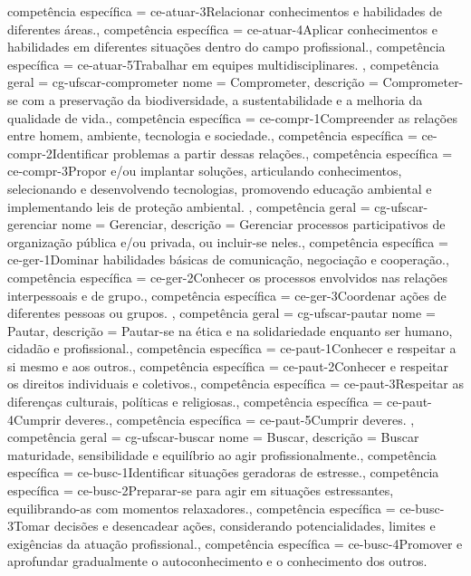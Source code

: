 {{        competência específica = {ce-atuar-3}{Relacionar conhecimentos e habilidades de diferentes áreas.},
        competência específica = {ce-atuar-4}{Aplicar conhecimentos e habilidades em diferentes situações dentro do campo profissional.},
        competência específica = {ce-atuar-5}{Trabalhar em equipes multidisciplinares.}
    },
    competência geral = {cg-ufscar-comprometer}{
        nome = Comprometer,
        descrição = {Comprometer-se com a preservação da biodiversidade, a sustentabilidade e a melhoria da qualidade de vida.},
        competência específica = {ce-compr-1}{Compreender as relações entre homem, ambiente, tecnologia e sociedade.},
        competência específica = {ce-compr-2}{Identificar problemas a partir dessas relações.},
        competência específica = {ce-compr-3}{Propor e/ou implantar soluções, articulando conhecimentos, selecionando e desenvolvendo tecnologias, promovendo educação ambiental e implementando leis de proteção ambiental.}
    },
    competência geral = {cg-ufscar-gerenciar}{
        nome = Gerenciar,
        descrição = {Gerenciar processos participativos de organização pública e/ou privada, ou incluir-se neles.},
        competência específica = {ce-ger-1}{Dominar habilidades básicas de comunicação, negociação e cooperação.},
        competência específica = {ce-ger-2}{Conhecer os processos envolvidos nas relações interpessoais e de grupo.},
        competência específica = {ce-ger-3}{Coordenar ações de diferentes pessoas ou grupos.}
    },
    competência geral = {cg-ufscar-pautar}{
        nome = Pautar,
        descrição = {Pautar-se na ética e na solidariedade enquanto ser humano, cidadão e profissional.},
        competência específica = {ce-paut-1}{Conhecer e respeitar a si mesmo e aos outros.},
        competência específica = {ce-paut-2}{Conhecer e respeitar os direitos individuais e coletivos.},
        competência específica = {ce-paut-3}{Respeitar as diferenças culturais, políticas e religiosas.},
        competência específica = {ce-paut-4}{Cumprir deveres.},
        competência específica = {ce-paut-5}{Cumprir deveres.} %
    },
    competência geral = {cg-ufscar-buscar}{
        nome = Buscar,
        descrição = {Buscar maturidade, sensibilidade e equilíbrio ao agir profissionalmente.},
        competência específica = {ce-busc-1}{Identificar situações geradoras de estresse.},
        competência específica = {ce-busc-2}{Preparar-se para agir em situações estressantes, equilibrando-as com momentos relaxadores.},
        competência específica = {ce-busc-3}{Tomar decisões e desencadear ações, considerando potencialidades, limites e exigências da atuação profissional.},
        competência específica = {ce-busc-4}{Promover e aprofundar gradualmente o autoconhecimento e o conhecimento dos outros.}
    }
}

